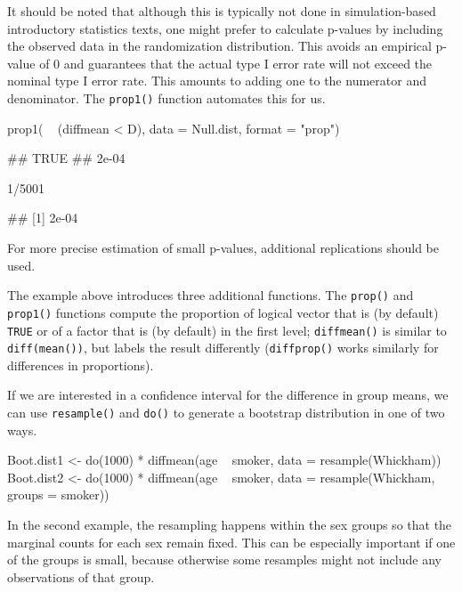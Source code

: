 It should be noted that although this is typically not done in
simulation-based introductory statistics texts, one might prefer to
calculate p-values by including the observed data in the randomization
distribution. This avoids an empirical p-value of 0 and guarantees that
the actual type I error rate will not exceed the nominal type I error
rate. This amounts to adding one to the numerator and denominator. The
\texttt{prop1()} function automates this for us.

\begin{Schunk}
\begin{Sinput}
prop1( ~ (diffmean < D), data = Null.dist, format = "prop")
\end{Sinput}
\begin{Soutput}
##  TRUE 
## 2e-04
\end{Soutput}
\begin{Sinput}
1/5001
\end{Sinput}
\begin{Soutput}
## [1] 2e-04
\end{Soutput}
\end{Schunk}

\noindent
For more precise estimation of small p-values, additional replications
should be used.

The example above introduces three additional  functions.
The \texttt{prop()} and \texttt{prop1()} functions compute the
proportion of logical vector that is (by default) \texttt{TRUE} or of a
factor that is (by default) in the first level; \texttt{diffmean()} is
similar to \texttt{diff(mean())}, but labels the result differently
(\texttt{diffprop()} works similarly for differences in proportions).

If we are interested in a confidence interval for the difference in
group means, we can use \texttt{resample()} and \texttt{do()} to
generate a bootstrap distribution in one of two ways.

\begin{Schunk}
\begin{Sinput}
Boot.dist1 <- do(1000) * diffmean(age ~ smoker, data = resample(Whickham))
Boot.dist2 <- do(1000) * diffmean(age ~ smoker, data = resample(Whickham, groups = smoker))
\end{Sinput}
\end{Schunk}

\noindent
In the second example, the resampling happens within the sex groups so
that the marginal counts for each sex remain fixed. This can be
especially important if one of the groups is small, because otherwise
some resamples might not include any observations of that group.

